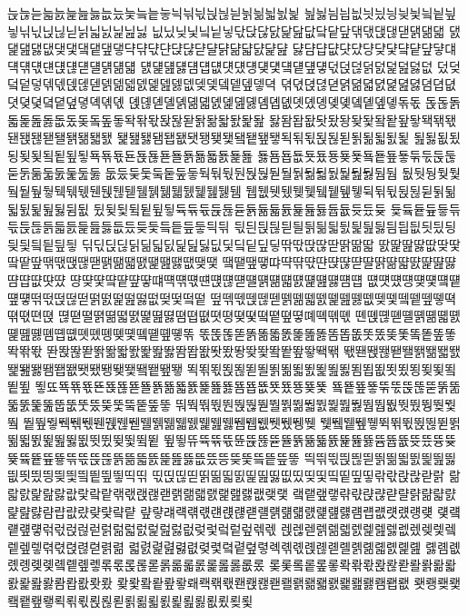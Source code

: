 늕늖늗늛늜늝늞늟늢늤늧늨늩늫늭늮늯늱늲늳늵늶늷늸늹
늺늻늼늽늾늿닀닁닂닃닄닅닆닇닊닋닍닎닏닑닓닔닕닖닗
닚닜닞닟닠닡닣닧닩닪닰닱닲닶닼닽닾댂댃댅댆댇댉댊댋
댌댍댎댏댒댖댗댘댙댚댛댝댞댟댠댡댢댣댤댥댦댧댨댩댪
댫댬댭댮댯댰댱댲댳댴댵댶댷댸댹댺댻댼댽댾댿덀덁덂덃
덄덅덆덇덈덉덊덋덌덍덎덏덐덑덒덓덗덙덚덝덠덡덢덣덦
덨덪덬덭덯덲덳덵덶덷덹덺덻덼덽덾덿뎂뎆뎇뎈뎉뎊뎋뎍
뎎뎏뎑뎒뎓뎕뎖뎗뎘뎙뎚뎛뎜뎝뎞뎟뎢뎣뎤뎥뎦뎧뎩뎪뎫
뎭뎮뎯뎰뎱뎲뎳뎴뎵뎶뎷뎸뎹뎺뎻뎼뎽뎾뎿돀돁돂돃돆돇
돉돊돍돏돑돒돓돖돘돚돜돞돟돡돢돣돥돦돧돩돪돫돬돭돮
돯돰돱돲돳돴돵돶돷돸돹돺돻돽돾돿됀됁됂됃됄됅됆됇됈
됉됊됋됌됍됎됏됑됒됓됔됕됖됗됙됚됛됝됞됟됡됢됣됤됥
됦됧됪됬됭됮됯됰됱됲됳됵됶됷됸됹됺됻됼됽됾됿둀둁둂
둃둄둅둆둇둈둉둊둋둌둍둎둏둒둓둕둖둗둙둚둛둜둝둞둟
둢둤둦둧둨둩둪둫둭둮둯둰둱둲둳둴둵둶둷둸둹둺둻둼둽
둾둿뒁뒂뒃뒄뒅뒆뒇뒉뒊뒋뒌뒍뒎뒏뒐뒑뒒뒓뒔뒕뒖뒗뒘
뒙뒚뒛뒜뒞뒟뒠뒡뒢뒣뒥뒦뒧뒩뒪뒫뒭뒮뒯뒰뒱뒲뒳뒴뒶
뒸뒺뒻뒼뒽뒾뒿듁듂듃듅듆듇듉듊듋듌듍듎듏듑듒듓듔듖
듗듘듙듚듛듞듟듡듢듥듧듨듩듪듫듮듰듲듳듴듵듶듷듹듺
듻듼듽듾듿딀딁딂딃딄딅딆딇딈딉딊딋딌딍딎딏딐딑딒딓
딖딗딙딚딝딞딟딠딡딢딣딦딫딬딭딮딯딲딳딵딶딷딹딺딻
딼딽딾딿땂땆땇땈땉땊땎땏땑땒땓땕땖땗땘땙땚땛땞땢땣
땤땥땦땧땨땩땪땫땬땭땮땯땰땱땲땳땴땵땶땷땸땹땺땻땼
땽땾땿떀떁떂떃떄떅떆떇떈떉떊떋떌떍떎떏떐떑떒떓떔떕
떖떗떘떙떚떛떜떝떞떟떢떣떥떦떧떩떬떭떮떯떲떶떷떸떹
떺떾떿뗁뗂뗃뗅뗆뗇뗈뗉뗊뗋뗎뗒뗓뗔뗕뗖뗗뗙뗚뗛뗜뗝
뗞뗟뗠뗡뗢뗣뗤뗥뗦뗧뗨뗩뗪뗫뗭뗮뗯뗰뗱뗲뗳뗴뗵뗶뗷
뗸뗹뗺뗻뗼뗽뗾뗿똀똁똂똃똄똅똆똇똈똉똊똋똌똍똎똏똒
똓똕똖똗똙똚똛똜똝똞똟똠똡똢똣똤똦똧똨똩똪똫똭똮똯
똰똱똲똳똵똶똷똸똹똺똻똼똽똾똿뙀뙁뙂뙃뙄뙅뙆뙇뙉뙊
뙋뙌뙍뙎뙏뙐뙑뙒뙓뙔뙕뙖뙗뙘뙙뙚뙛뙜뙝뙞뙟뙠뙡뙢뙣
뙥뙦뙧뙩뙪뙫뙬뙭뙮뙯뙰뙱뙲뙳뙴뙵뙶뙷뙸뙹뙺뙻뙼뙽뙾
뙿뚀뚁뚂뚃뚄뚅뚆뚇뚈뚉뚊뚋뚌뚍뚎뚏뚐뚑뚒뚓뚔뚕뚖뚗
뚘뚙뚚뚛뚞뚟뚡뚢뚣뚥뚦뚧뚨뚩뚪뚭뚮뚯뚰뚲뚳뚴뚵뚶뚷
뚸뚹뚺뚻뚼뚽뚾뚿뛀뛁뛂뛃뛄뛅뛆뛇뛈뛉뛊뛋뛌뛍뛎뛏뛐
뛑뛒뛓뛕뛖뛗뛘뛙뛚뛛뛜뛝뛞뛟뛠뛡뛢뛣뛤뛥뛦뛧뛨뛩뛪
뛫뛬뛭뛮뛯뛱뛲뛳뛵뛶뛷뛹뛺뛻뛼뛽뛾뛿뜂뜃뜄뜆뜇뜈뜉
뜊뜋뜌뜍뜎뜏뜐뜑뜒뜓뜔뜕뜖뜗뜘뜙뜚뜛뜜뜝뜞뜟뜠뜡뜢
뜣뜤뜥뜦뜧뜪뜫뜭뜮뜱뜲뜳뜴뜵뜶뜷뜺뜼뜽뜾뜿띀띁띂띃
띅띆띇띉띊띋띍띎띏띐띑띒띓띖띗띘띙띚띛띜띝띞띟띡띢
띣띥띦띧띩띪띫띬띭띮띯띲띴띶띷띸띹띺띻띾띿랁랂랃랅
랆랇랈랉랊랋랎랓랔랕랚랛랝랞랟랡랢랣랤랥랦랧랪랮랯
랰랱랲랳랶랷랹랺랻랼랽랾랿럀럁럂럃럄럅럆럈럊럋럌럍
럎럏럐럑럒럓럔럕럖럗럘럙럚럛럜럝럞럟럠럡럢럣럤럥럦
럧럨럩럪럫럮럯럱럲럳럵럶럷럸럹럺럻럾렂렃렄렅렆렊렋
렍렎렏렑렒렓렔렕렖렗렚렜렞렟렠렡렢렣렦렧렩렪렫렭렮
렯렰렱렲렳렶렺렻렼렽렾렿롁롂롃롅롆롇롈롉롊롋롌롍롎
롏롐롒롔롕롖롗롘롙롚롛롞롟롡롢롣롥롦롧롨롩롪롫롮롰
롲롳롴롵롶롷롹롺롻롽롾롿뢀뢁뢂뢃뢄뢅뢆뢇뢈뢉뢊뢋뢌
뢎뢏뢐뢑뢒뢓뢔뢕뢖뢗뢘뢙뢚뢛뢜뢝뢞뢟뢠뢡뢢뢣뢤뢥뢦
뢧뢩뢪뢫뢬뢭뢮뢯뢱뢲뢳뢵뢶뢷뢹뢺뢻뢼뢽뢾뢿룂룄룆룇
